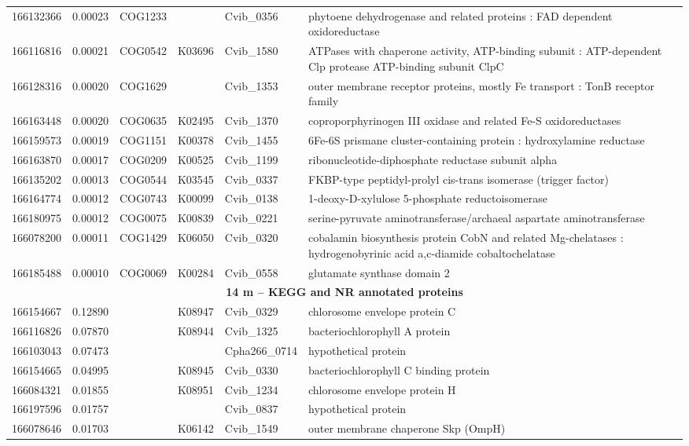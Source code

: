 \begin{landscape}
\begin{longtable}{p{1.8cm}p{0.9cm}p{2.2cm}p{1cm}p{2.8cm}p{13.4cm}}
166132366&0.00023&COG1233&&Cvib\_0356&phytoene dehydrogenase and related proteins : FAD dependent oxidoreductase \\
166116816&0.00021&COG0542&K03696&Cvib\_1580&ATPases with chaperone activity, ATP-binding subunit : ATP-dependent Clp protease ATP-binding subunit ClpC \\
166128316&0.00020&COG1629&&Cvib\_1353&outer membrane receptor proteins, mostly Fe transport : TonB receptor family \\
166163448&0.00020&COG0635&K02495&Cvib\_1370&coproporphyrinogen III oxidase and related Fe-S oxidoreductases \\
166159573&0.00019&COG1151&K00378&Cvib\_1455&6Fe-6S prismane cluster-containing protein : hydroxylamine reductase \\
166163870&0.00017&COG0209&K00525&Cvib\_1199&ribonucleotide-diphosphate reductase subunit alpha \\
166135202&0.00013&COG0544&K03545&Cvib\_0337&FKBP-type peptidyl-prolyl cis-trans isomerase (trigger factor) \\
166164774&0.00012&COG0743&K00099&Cvib\_0138&1-deoxy-D-xylulose 5-phosphate reductoisomerase \\
166180975&0.00012&COG0075&K00839&Cvib\_0221&serine-pyruvate aminotransferase/archaeal aspartate aminotransferase \\
166078200&0.00011&COG1429&K06050&Cvib\_0320&cobalamin biosynthesis protein CobN and related Mg-chelatases : hydrogenobyrinic acid a,c-diamide cobaltochelatase \\
166185488&0.00010&COG0069&K00284&Cvib\_0558&glutamate synthase domain 2 \\
\toprule
\multicolumn{6}{c}{\textbf{14 m -- \acs{KEGG} and \acs{NR} annotated proteins}}  \\
\midrule
166154667&0.12890&&K08947&Cvib\_0329&chlorosome envelope protein C \\
166116826&0.07870&&K08944&Cvib\_1325&bacteriochlorophyll A protein \\
166103043&0.07473&&&Cpha266\_0714&hypothetical protein \\
166154665&0.04995&&K08945&Cvib\_0330&bacteriochlorophyll C binding protein \\
166084321&0.01855&&K08951&Cvib\_1234&chlorosome envelope protein H \\
166197596&0.01757&&&Cvib\_0837&hypothetical protein \\
166078646&0.01703&&K06142&Cvib\_1549&outer membrane chaperone Skp (OmpH) \\

\end{longtable}
\end{landscape}
